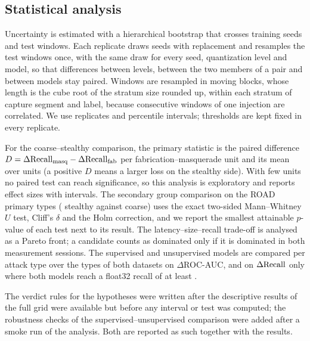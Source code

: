 \subsection{Statistical analysis}
Uncertainty is estimated with a hierarchical bootstrap that crosses training seeds and test windows. Each replicate
draws seeds with replacement and resamples the test windows once, with the same draw for every seed, quantization
level and model, so that differences between levels, between the two members of a pair and between models stay
paired. Windows are resampled in moving blocks, whose length is the cube root of the stratum size rounded up,
within each stratum of capture segment and label, because consecutive windows of one injection are correlated. We
use \NBoot{} replicates and \CIPct{} percentile intervals; thresholds are kept fixed in every replicate.

For the coarse--stealthy comparison, the primary statistic is the paired difference
$D = \Delta\mathrm{Recall}_{\mathrm{masq}} - \Delta\mathrm{Recall}_{\mathrm{fab}}$ per fabrication--masquerade unit and its mean over units
(a positive $D$ means a larger loss on the stealthy side). With few units no paired test can reach significance, so this analysis is
exploratory and reports effect sizes with intervals. The secondary group comparison on the ROAD primary types
(\GroupStealthy{} stealthy against \GroupCoarse{} coarse) uses the exact two-sided Mann--Whitney $U$ test, Cliff's
$\delta$ and the Holm correction, and we report the smallest attainable $p$-value of each test next to its result.
The latency--size--recall trade-off is analysed as a Pareto front; a candidate counts as dominated only if it is
dominated in both measurement sessions. The supervised and unsupervised models are compared per attack type over
the \ASThreeTypes{} types of both datasets on $\Delta$ROC-AUC, and on $\Delta\mathrm{Recall}$ only where both models reach a
float32 recall of at least \RecallFloorAS.

The verdict rules for the hypotheses were written after the descriptive results of the full grid were available
but before any interval or test was computed; the robustness checks of the supervised--unsupervised comparison were
added after a smoke run of the analysis. Both are reported as such together with the results.

